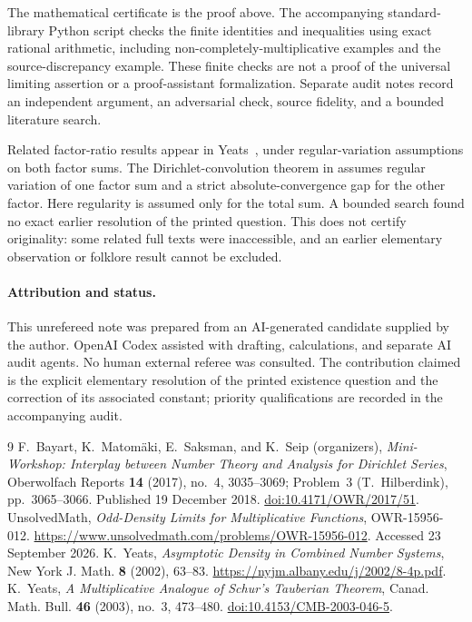 \documentclass[11pt]{article}
\begin{document}
The mathematical certificate is the proof above. The accompanying standard-library Python script checks the finite identities and inequalities using exact rational arithmetic, including non-completely-multiplicative examples and the source-discrepancy example. These finite checks are not a proof of the universal limiting assertion or a proof-assistant formalization. Separate audit notes record an independent argument, an adversarial check, source fidelity, and a bounded literature search.

Related factor-ratio results appear in Yeats~\cite[Proposition~43]{yeats02}, under regular-variation assumptions on both factor sums. The Dirichlet-convolution theorem in \cite[Theorem~2]{yeats03} assumes regular variation of one factor sum and a strict absolute-convergence gap for the other factor. Here regularity is assumed only for the total sum. A bounded search found no exact earlier resolution of the printed question. This does not certify originality: some related full texts were inaccessible, and an earlier elementary observation or folklore result cannot be excluded.

\paragraph{Attribution and status.}
This unrefereed note was prepared from an AI-generated candidate supplied by the author. OpenAI Codex assisted with drafting, calculations, and separate AI audit agents. No human external referee was consulted. The contribution claimed is the explicit elementary resolution of the printed existence question and the correction of its associated constant; priority qualifications are recorded in the accompanying audit.

\begin{thebibliography}{9}
 F.~Bayart, K.~Matom\"aki, E.~Saksman, and K.~Seip (organizers), \emph{Mini-Workshop: Interplay between Number Theory and Analysis for Dirichlet Series}, Oberwolfach Reports \textbf{14} (2017), no.~4, 3035--3069; Problem~3 (T.~Hilberdink), pp.~3065--3066. Published 19 December 2018. \href{https://doi.org/10.4171/OWR/2017/51}{doi:10.4171/OWR/2017/51}.
 UnsolvedMath, \emph{Odd-Density Limits for Multiplicative Functions}, OWR-15956-012. \url{https://www.unsolvedmath.com/problems/OWR-15956-012}. Accessed 23 September 2026.
 K.~Yeats, \emph{Asymptotic Density in Combined Number Systems}, New York J. Math. \textbf{8} (2002), 63--83. \url{https://nyjm.albany.edu/j/2002/8-4p.pdf}.
 K.~Yeats, \emph{A Multiplicative Analogue of Schur's Tauberian Theorem}, Canad. Math. Bull. \textbf{46} (2003), no.~3, 473--480. \href{https://doi.org/10.4153/CMB-2003-046-5}{doi:10.4153/CMB-2003-046-5}.
\end{thebibliography}
\end{document}
